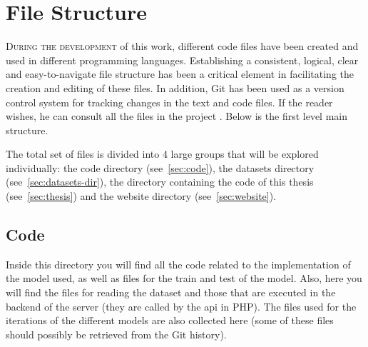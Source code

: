 

\chapter{File Structure}\label{cha:files}



\lettrine{D}{uring the development} of this work, different code files have
been created and used in different programming languages. Establishing a
consistent, logical, clear and easy-to-navigate file structure has been a
critical element in facilitating the creation and editing of these files. In
addition, Git has been used as a version control system for tracking changes in
the text and code files. If the reader wishes, he can consult all the files in
the project
. Below
is the first level main structure.\medskip

\medskip

The total set of files is divided into 4 large groups that will be explored
individually: the code directory (see\ \vref{sec:code}), the datasets directory
(see\ \vref{sec:datasets-dir}), the directory containing the code of this
thesis (see\ \vref{sec:thesis}) and the website directory (see\
\vref{sec:website}).



\section{Code}\label{sec:code}

Inside this directory you will find all the code related to the implementation
of the model used, as well as files for the train and test of the model. Also,
here you will find the files for reading the dataset and those that are
executed in the backend of the server (they are called by the \gls{api} in
PHP). The files used for the iterations of the different models are also
collected here (some of these files should possibly be retrieved from the Git
history).\medskip




